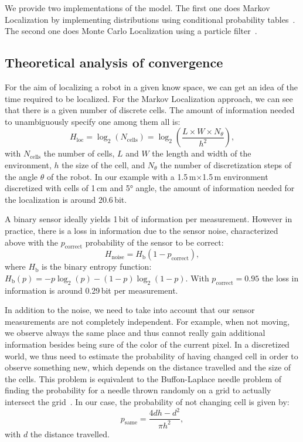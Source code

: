 \documentclass[letterpaper, 10pt, conference]{ieeeconf}
\begin{document}
We provide two implementations of the model.
The first one does Markov Localization by implementing distributions using conditional probability tables~\cite{fox1999markov}.
The second one does Monte Carlo Localization using a particle filter~\cite{dellaert1999monte}.

\subsection{Theoretical analysis of convergence}
\label{sec:theoreticalconv}

For the aim of localizing a robot in a given know space, we can get an idea of the time required to be localized.
For the Markov Localization approach, we can see that there is a given number of discrete cells.
The amount of information needed to unambiguously specify one among them all is:
\begin{displaymath}
	H_\mathrm{loc} = \log_2(N_\mathrm{cells}) = \log_2\left(\frac{L\times W\times N_{\theta}}{h^2}\right),
\end{displaymath}
with $N_\mathrm{cells}$ the number of cells, $L$ and $W$ the length and width of the environment, $h$ the size of the cell, and $N_{\theta}$ the number of discretization steps of the angle $\theta$ of the robot.
In our example with a 1.5\,m$\times$1.5\,m environment discretized with cells of 1\,cm and 5° angle, the amount of information needed for the localization is around 20.6\,bit.

A binary sensor ideally yields 1\,bit of information per measurement.
However in practice, there is a loss in information due to the sensor noise, characterized above with the $p_\mathrm{correct}$ probability of the sensor to be correct:
\begin{displaymath}
	H_\mathrm{noise} = H_{\text{b}}(1 - p_\mathrm{correct}),
\end{displaymath}
where $H_{\text{b}}$ is the binary entropy function: $H_{\text{b}}(p) = -p\log_2(p) - (1-p)\log_2(1-p)$.
With $p_\mathrm{correct}=0.95$ the loss in information is around 0.29\,bit per measurement.

In addition to the noise, we need to take into account that our sensor measurements are not completely independent.
For example, when not moving, we observe always the same place and thus cannot really gain additional information besides being sure of the color of the current pixel.
In a discretized world, we thus need to estimate the probability of having changed cell in order to observe something new, which depends on the distance travelled and the size of the cells.
This problem is equivalent to the Buffon-Laplace needle problem of finding the probability for a needle thrown randomly on a grid to actually intersect the grid~\cite{laplace1820prob}.
In our case, the probability of not changing cell is given by:
\begin{displaymath}
	p_\mathrm{same} = \frac{4d h - d^2}{\pi h^2},
\end{displaymath}
with $d$ the distance travelled.
\end{document}
